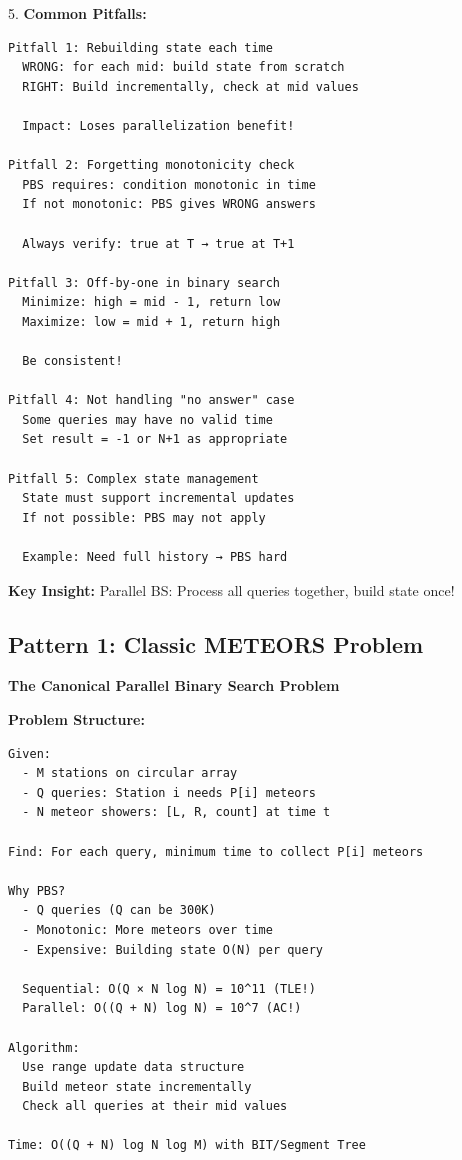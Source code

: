 \documentclass[11pt,a4paper,oneside]{book}
\begin{document}
\begin{tcolorbox}[
    enhanced,breakable,
    colback=white,
    colframe=deepblue,
    boxrule=1.5pt,
    arc=3mm,
    title=\textbf{The Offline Processing Paradigm}
]
5. \textbf{Common Pitfalls:}
\begin{verbatim}
Pitfall 1: Rebuilding state each time
  WRONG: for each mid: build state from scratch
  RIGHT: Build incrementally, check at mid values
  
  Impact: Loses parallelization benefit!

Pitfall 2: Forgetting monotonicity check
  PBS requires: condition monotonic in time
  If not monotonic: PBS gives WRONG answers
  
  Always verify: true at T → true at T+1

Pitfall 3: Off-by-one in binary search
  Minimize: high = mid - 1, return low
  Maximize: low = mid + 1, return high
  
  Be consistent!

Pitfall 4: Not handling "no answer" case
  Some queries may have no valid time
  Set result = -1 or N+1 as appropriate

Pitfall 5: Complex state management
  State must support incremental updates
  If not possible: PBS may not apply
  
  Example: Need full history → PBS hard
\end{verbatim}

\textbf{Key Insight:}
Parallel BS: Process all queries together, build state once!
\end{tcolorbox}

\subsection{Pattern 1: Classic METEORS Problem}

\begin{tcolorbox}[
    enhanced,breakable,
    colback=successgreen!10,
    colframe=successgreen,
    boxrule=1.5pt,
    arc=3mm,
    title=\textbf{Complete METEORS Algorithm}
]
\textbf{The Canonical Parallel Binary Search Problem}

\textbf{Problem Structure:}
\begin{verbatim}
Given:
  - M stations on circular array
  - Q queries: Station i needs P[i] meteors
  - N meteor showers: [L, R, count] at time t
  
Find: For each query, minimum time to collect P[i] meteors

Why PBS?
  - Q queries (Q can be 300K)
  - Monotonic: More meteors over time
  - Expensive: Building state O(N) per query
  
  Sequential: O(Q × N log N) = 10^11 (TLE!)
  Parallel: O((Q + N) log N) = 10^7 (AC!)

Algorithm:
  Use range update data structure
  Build meteor state incrementally
  Check all queries at their mid values

Time: O((Q + N) log N log M) with BIT/Segment Tree
\end{verbatim}
\end{tcolorbox}
\end{document}
